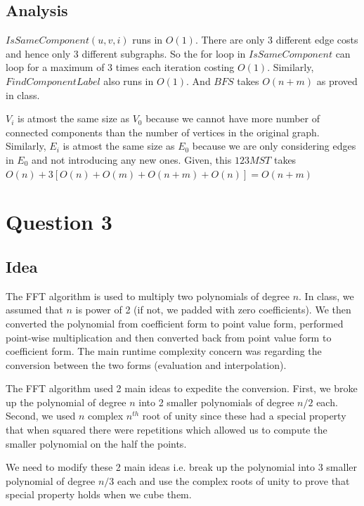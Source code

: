 \documentclass{article}
\begin{document}
    \subsection*{Analysis}
    $IsSameComponent(u, v, i)$ runs in $O(1)$. There are only 3 different edge costs and hence only 3 different subgraphs. So the for loop in $IsSameComponent$ can loop for a maximum of 3 times each iteration costing $O(1)$. Similarly, $FindComponentLabel$ also runs in $O(1)$. And $BFS$ takes $O(n+m)$ as proved in class.
    
    $V_i$ is atmost the same size as $V_0$ because we cannot have more number of connected components than the number of vertices in the original graph. Similarly, $E_i$ is atmost the same size as $E_0$ because we are only considering edges in $E_0$ and not introducing any new ones. Given, this $123MST$ takes $O(n) + 3[O(n) + O(m) + O(n+m) + O(n)] = O(n+m)$

    \section*{Question 3}

    \subsection*{Idea}
    The FFT algorithm is used to multiply two polynomials of degree $n$. In class, we assumed that $n$ is power of 2 (if not, we padded with zero coefficients). We then converted the polynomial from coefficient form to point value form, performed point-wise multiplication and then converted back from point value form to coefficient form. The main runtime complexity concern was regarding the conversion between the two forms (evaluation and interpolation).

    The FFT algorithm used 2 main ideas to expedite the conversion. First, we broke up the polynomial of degree $n$ into 2 smaller polynomials of degree $n/2$ each. Second, we used $n$ complex $n^{th}$ root of unity since these had a special property that when squared there were repetitions which allowed us to compute the smaller polynomial on the half the points.

    We need to modify these 2 main ideas i.e. break up the polynomial into 3 smaller polynomial of degree $n/3$ each and use the complex roots of unity to prove that special property holds when we cube them.
    
\end{document}
